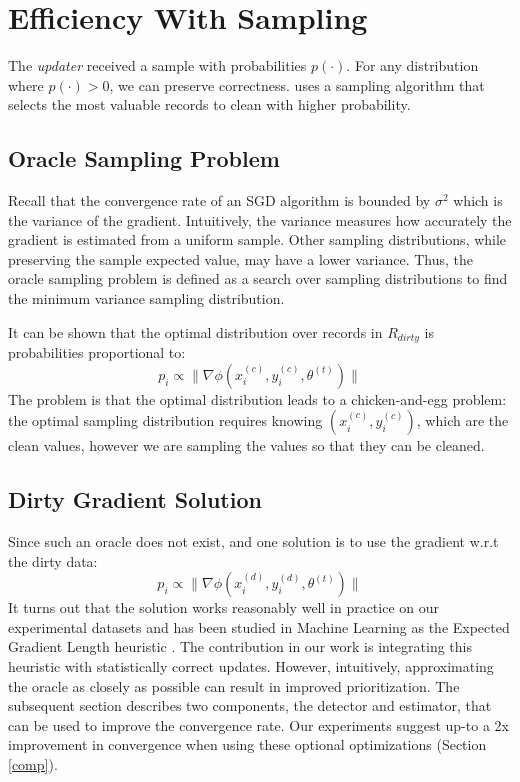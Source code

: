 \section{Efficiency With Sampling}\label{dist-samp}
The \emph{updater} received a sample with probabilities $p(\cdot)$.
For any distribution where  $p(\cdot) > 0$, we can preserve correctness.
\sys uses a sampling algorithm that selects the most valuable records to clean with higher probability. 

\subsection{Oracle Sampling Problem}
Recall that the convergence rate of an SGD algorithm is bounded by $\sigma^2$ which is the variance of the gradient.
Intuitively, the variance measures how accurately the gradient is estimated from a uniform sample.
Other sampling distributions, while preserving the sample expected value, may have a lower variance.
Thus, the oracle sampling problem is defined as a search over sampling distributions to find the minimum variance sampling distribution.

It can be shown that the optimal distribution over records in $R_{dirty}$ is probabilities proportional to:
\[
p_i \propto \|\nabla\phi(x^{(c)}_i,y^{(c)}_i,\theta^{(t)})\|
\]
The problem is that the optimal distribution leads to a chicken-and-egg problem:
the optimal sampling distribution requires knowing $(x^{(c)}_i,y^{(c)}_i)$, which are the clean values, however we are sampling the values so that they can be cleaned.

\subsection{Dirty Gradient Solution}\label{dgsample}
Since such an oracle does not exist, and one solution is to use the gradient w.r.t the dirty data:
\[
p_i \propto \|\nabla\phi(x^{(d)}_i,y^{(d)}_i,\theta^{(t)})\|
\]
It turns out that the solution works reasonably well in practice on our experimental datasets and has been studied in Machine Learning as the Expected Gradient Length heuristic \cite{settles2010active}.
The contribution in our work is integrating this heuristic with statistically correct updates.
However, intuitively, approximating the oracle as closely as possible can result in improved prioritization.
The subsequent section describes two components, the detector and estimator, that can be used to improve the convergence rate.
Our experiments suggest up-to a 2x improvement in convergence when using these optional optimizations (Section \ref{comp}).